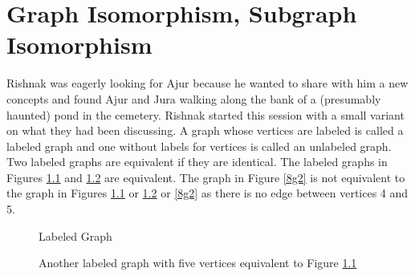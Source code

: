 \chapter{Graph Isomorphism, Subgraph Isomorphism}

Rishnak was eagerly looking for Ajur because he wanted to share with him a new concepts and found Ajur and Jura walking along the bank of a (presumably haunted) pond in the cemetery. Rishnak started this session with a small variant on what they had been discussing. A graph whose vertices are labeled is called a labeled graph and one without labels for vertices is called an unlabeled graph. Two labeled graphs are equivalent if they are identical. The labeled graphs in Figures \ref{8g1} and \ref{8g11} are equivalent. The graph in Figure \ref{8g2} is not equivalent to the graph in Figures \ref{8g1} or \ref{8g11} or  \ref{8g2} as there is no edge between vertices 4 and 5.
\begin{figure}
\begin{center}
\caption{Labeled Graph}\label{8g1}
\end{center}

\end{figure}
\begin{figure}
\begin{center}
\caption{ Another labeled graph with five vertices equivalent to Figure \ref{8g1}}\label{8g11}
\end{center}
\end{figure}

